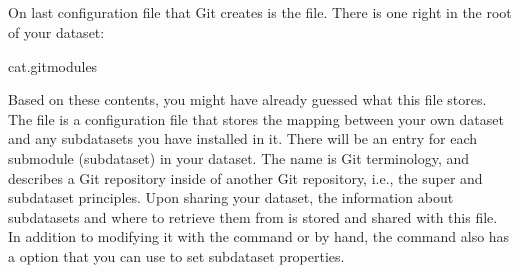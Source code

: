\ignorespaces 

\subsection{}
\label{\detokenize{basics/101-123-config2:gitmodules}}\label{\detokenize{basics/101-123-config2:index-1}}
\sphinxAtStartPar
On last configuration file that Git creates is the  file.
There is one right in the root of your dataset:

\begin{sphinxVerbatim}[commandchars=\\\{\}]
cat.gitmodules
\end{sphinxVerbatim}

\sphinxAtStartPar
Based on these contents, you might have already guessed what this file
stores. The  file is a configuration file that stores the mapping between
your own dataset and any subdatasets you have installed in it.
There will be an entry for each submodule (subdataset) in your dataset.
The name  is Git terminology, and describes a Git repository inside of
another Git repository, i.e., the super\sphinxhyphen{} and subdataset principles.
Upon sharing your dataset, the information about subdatasets and where to retrieve
them from is stored and shared with this file.
In addition to modifying it with the  command or by hand, the  command also has a  option that you can use to set subdataset properties.

